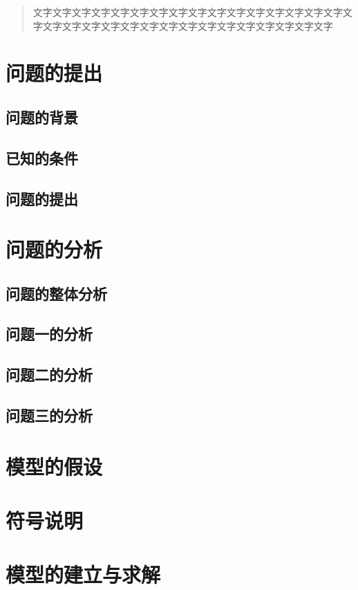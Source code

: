 \documentclass{JXUSTmodeling}
\begin{document}
\begin{abstract}
  文字文字文字文字文字文字文字文字文字文字文字文字文字文字文字文字文字文字文字文字文字文字文字文字文字文字文字文字文字文字文字文字
\end{abstract}
\section{问题的提出}\label{sec:1}
\subsection{问题的背景}\label{sub:1.1}
\subsection{已知的条件}\label{sub:1.2}
\subsection{问题的提出}\label{sub:1.3}

\section{问题的分析}\label{sec:2}
\subsection{问题的整体分析}\label{sub:2.1}
\subsection{问题一的分析}\label{sub:2.2}
\subsection{问题二的分析}\label{sub:2.3}
\subsection{问题三的分析}\label{sub:2.4}

\section{模型的假设}\label{sec:3}

\section{符号说明}\label{sec:4}

\section{模型的建立与求解}\label{sec:5}
\end{document}
